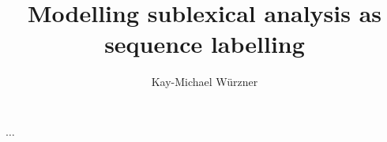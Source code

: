 \documentclass[hlcolor=000000,logo=logo.pdf]{modernposter}
\title{Modelling sublexical analysis as sequence labelling}
\author{Kay-Michael Würzner}
\begin{document}
  \maketitle

  \begin{postercolumn}
  \end{postercolumn} 
  \begin{postercolumn}
      {}{ 
        $\dots$
      }
  \end{postercolumn}
\end{document}
